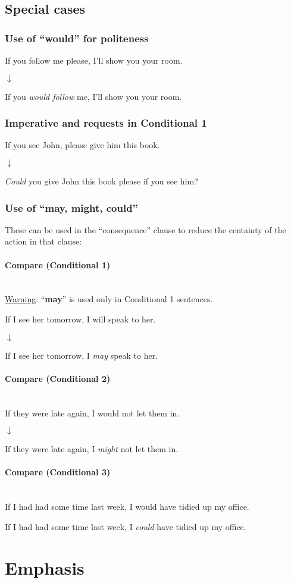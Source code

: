 \documentclass{article}
\newcommand{\wrn}{\underline{Warning}: }
\newcommand{\pph}[1]{\paragraph{#1} \phantom{}\\}
\begin{document}
\newpage
\subsection{Special cases}
\subsubsection{Use of ``would'' for politeness}
If you follow me please, I'll show you your room.

\hspace*{3.6cm}$\downarrow$

If you \textit{would follow} me, I'll show you your room.

\subsubsection{Imperative and requests in Conditional 1}
If you see John, please give him this book.

\hspace*{3.6cm}$\downarrow$

\textit{Could} you give John this book please if you see him?

\subsubsection{Use of ``may, might, could''}
These can be used in the ``consequence'' clause to reduce the centainty
of the action in that clause:

\pph{Compare (Conditional 1)}
\wrn{``\textbf{may}'' is used only in Conditional 1 sentences.}

If I see her tomorrow, I will speak to her.

\hspace*{3cm}$\downarrow$

If I see her tomorrow, I \textit{may} speak to her.

\pph{Compare (Conditional 2)}
If they were late again, I would not let them in.

\hspace*{3.5cm}$\downarrow$

If they were late again, I \textit{might} not let them in.

\pph{Compare (Conditional 3)}
If I had had some time last week, I would have tidied up my office.

If I had had some time last week, I \textit{could} have tidied up my office.

\newpage
\section{Emphasis}
\end{document}
